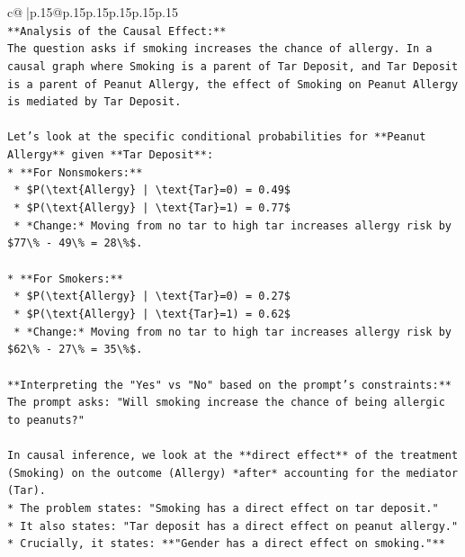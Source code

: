 \documentclass{article}
\begin{document}
{\begin{supertabular}{c@{$\;$}|p{.15\linewidth}@{}p{.15\linewidth}p{.15\linewidth}p{.15\linewidth}p{.15\linewidth}p{.15\linewidth}}
{{{\\ 
\texttt{**Analysis of the Causal Effect:**} \\
\texttt{The question asks if smoking increases the chance of allergy. In a causal graph where Smoking is a parent of Tar Deposit, and Tar Deposit is a parent of Peanut Allergy, the effect of Smoking on Peanut Allergy is mediated by Tar Deposit.} \\
\\ 
\texttt{Let's look at the specific conditional probabilities for **Peanut Allergy** given **Tar Deposit**:} \\
\texttt{*   **For Nonsmokers:**} \\
\texttt{    *   \$P(\textbackslash{}text\{Allergy\} | \textbackslash{}text\{Tar\}=0) = 0.49\$} \\
\texttt{    *   \$P(\textbackslash{}text\{Allergy\} | \textbackslash{}text\{Tar\}=1) = 0.77\$} \\
\texttt{    *   *Change:* Moving from no tar to high tar increases allergy risk by \$77\textbackslash{}\% {-} 49\textbackslash{}\% = 28\textbackslash{}\%\$.} \\
\\ 
\texttt{*   **For Smokers:**} \\
\texttt{    *   \$P(\textbackslash{}text\{Allergy\} | \textbackslash{}text\{Tar\}=0) = 0.27\$} \\
\texttt{    *   \$P(\textbackslash{}text\{Allergy\} | \textbackslash{}text\{Tar\}=1) = 0.62\$} \\
\texttt{    *   *Change:* Moving from no tar to high tar increases allergy risk by \$62\textbackslash{}\% {-} 27\textbackslash{}\% = 35\textbackslash{}\%\$.} \\
\\ 
\texttt{**Interpreting the "Yes" vs "No" based on the prompt's constraints:**} \\
\texttt{The prompt asks: "Will smoking increase the chance of being allergic to peanuts?"} \\
\\ 
\texttt{In causal inference, we look at the **direct effect** of the treatment (Smoking) on the outcome (Allergy) *after* accounting for the mediator (Tar).} \\
\texttt{*   The problem states: "Smoking has a direct effect on tar deposit."} \\
\texttt{*   It also states: "Tar deposit has a direct effect on peanut allergy."} \\
\texttt{*   Crucially, it states: **"Gender has a direct effect on smoking."**} \\
}}}
\end{supertabular}}
\end{document}
